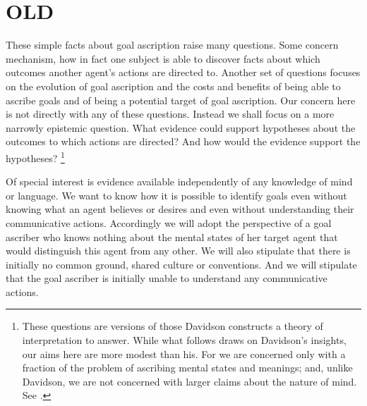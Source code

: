 \documentclass[12pt,a4paper]{extarticle}
\begin{document}
\section{OLD}

These simple facts about goal ascription raise many questions.
Some concern mechanism, how in fact one subject is able to discover facts about which outcomes another agent's actions are directed to.
Another set of questions focuses on the evolution of goal ascription and the costs and benefits of being able to ascribe goals and of being a potential target of goal ascription.
Our concern here is not directly with any of these questions.
Instead we shall focus on a more narrowly epistemic question.
What evidence could support hypotheses about the outcomes to which actions are directed?
And how would the evidence support the hypotheses?%
\footnote{
These questions are versions of those Davidson constructs a theory of interpretation to answer.
While what follows draws  on Davidson's insights,
our aims here are more modest than his.
For we are concerned only with a  fraction of the problem of ascribing mental states and meanings;
and, unlike Davidson, we are not concerned with larger claims about the nature of mind.
See
\citet{Davidson:1973jx,Davidson:1990du,lepore_donald_2005}.
}

Of special interest is evidence available independently of any knowledge of mind or language.
We want to know how it is possible to identify goals even without knowing what an agent believes or desires and even without understanding their communicative actions.
Accordingly we will adopt the perspective of a goal ascriber who knows nothing about the mental states of her target agent that would distinguish this agent from any other.
We will also stipulate that there is initially no common ground, shared culture or conventions.
And we will stipulate that the goal ascriber is initially unable to understand any communicative actions.
\end{document}
